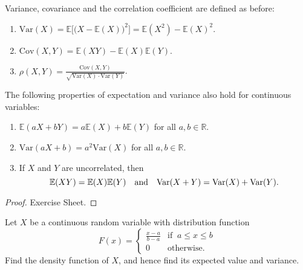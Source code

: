 \documentclass[lecture]{csm}
\newcommand{\expe}{\mathbb{E}}
\newcommand{\var}{\text{Var}}
\newcommand{\cov}{\text{Cov}}
\newcommand{\R}{\mathbb{R}}
\def\it{\item}
\def\bit{\begin{itemize}}
\def\eit{\end{itemize}}
\def\ben{\begin{enumerate}}
\def\een{\end{enumerate}}
\begin{document}
\vspace{2ex}
\begin{definition}
Variance, covariance and the correlation coefficient are defined as before:
\ben
\it $\var(X) = \expe\big[\big(X-\expe(X)\big)^2\big] = \expe(X^2) - \expe(X)^2$.
\it $\cov(X,Y) = \expe(XY) - \expe(X)\expe(Y)$.
\it $\rho(X,Y) = \displaystyle\frac{\cov(X,Y)}{\sqrt{\var(X)\cdot\var(Y)}}$.
\een
\end{definition}

\newpage

The following properties of expectation and variance also hold for continuous variables:
\begin{theorem}
\ben
\it $\expe(aX+bY) = a\expe(X) + b\expe(Y)$ for all $a,b\in\R$.
\it $\var(aX+b) = a^2\var(X)$ for all $a,b\in\R$.
\it If $X$ and $Y$ are uncorrelated, then 
\[
\expe(XY)=\expe(X)\expe(Y) \text{\quad and\quad} \var(X+Y)=\var(X)+\var(Y).
\]
\een
\end{theorem}

\begin{proof}
Exercise Sheet.
\end{proof}


\newpage
\begin{example}\label{ex:continuous_uniform}
Let $X$ be a continuous random variable with distribution function
\[
F(x) = \begin{cases}
	\displaystyle\frac{x-a}{b-a}	& \text{if }\ a\leq x\leq b \\[2ex]
	0							& \text{otherwise.}
\end{cases}	
\]
Find the density function of $X$, and hence find its expected value and variance.
\end{example}
\end{document}
